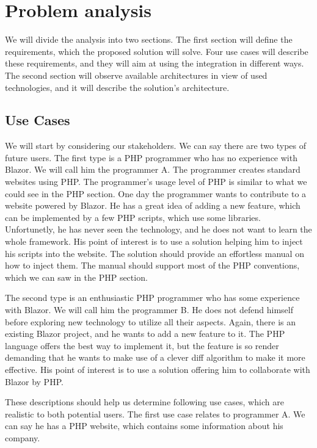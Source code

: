 \chapter{Problem analysis}

We will divide the analysis into two sections.
The first section will define the requirements, which the proposed solution will solve.
Four use cases will describe these requirements, and they will aim at using the integration in different ways.
The second section will observe available architectures in view of used technologies, and it will describe the solution's architecture.

\section{Use Cases}
We will start by considering our stakeholders.
We can say there are two types of future users.
The first type is a PHP programmer who has no experience with Blazor.
We will call him the programmer A.
The programmer creates standard websites using PHP.
The programmer's usage level of PHP is similar to what we could see in the PHP section. 
One day the programmer wants to contribute to a website powered by Blazor.
He has a great idea of adding a new feature, which can be implemented by a few PHP scripts, which use some libraries.
Unfortunetly, he has never seen the technology, and he does not want to learn the whole framework.
His point of interest is to use a solution helping him to inject his scripts into the website.
The solution should provide an effortless manual on how to inject them.
The manual should support most of the PHP conventions, which we can saw in the PHP section.
\par
The second type is an enthusiastic PHP programmer who has some experience with Blazor.
We will call him the programmer B.
He does not defend himself before exploring new technology to utilize all their aspects.
Again, there is an existing Blazor project, and he wants to add a new feature to it.
The PHP language offers the best way to implement it, but the feature is so render demanding that he wants to make use of a clever diff algorithm to make it more effective.
His point of interest is to use a solution offering him to collaborate with Blazor by PHP.
\par
These descriptions should help us determine following use cases, which are realistic to both potential users.
The first use case relates to programmer A.
We can say he has a PHP website, which contains some information about his company.

